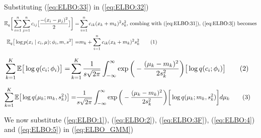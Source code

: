 \documentclass[]{article}
\newcommand{\Expectation} {\mathbb{E}}
\newcommand\numberthis    {\addtocounter{equation}{1}\tag{\theequation}}
\begin{document}
Substituting (\ref{eq:ELBO:33}) in (\ref{eq:ELBO:32})
\begin{align*}
	\Expectation_q\bigg[\sum_{i=1}^{n}\sum_{j=1}^{n} c_{ij}\big[\frac{-(x_i-\mu_j)^2}{2}\big]\bigg]=& \sum_{i=1}^{n} c_{ik} (x_k+m_k)^2 s_k^2 \text{, combing with (\ref{eq:ELBO:31}), (\ref{eq:ELBO:3}) becomes}\\
	\Expectation_q\big[\log{p(x_i\mid c_i,\mu);\phi_i,m,s^2}\big] =& m_k + \sum_{i=1}^{n} c_{ik} (x_k+m_k)^2 s_k^2 \numberthis \label{eq:ELBO:3F}	
\end{align*}


\begin{align*}
	\sum_{k=1}^K\Expectation\big[\log{q(c_i;\phi_i)}\big] =& \sum_{k=1}^K\frac{1}{s\sqrt{2\pi}} \int_{-\infty}^{\infty} \exp{\bigg(- \frac{(\mu_k-m_k)^2}{2 s_k^2}\bigg)}\big[\log{q(c_i;\phi_i)}\big] \numberthis \label{eq:ELBO:4}
\end{align*}

\begin{align*}
 	\sum_{k=1}^K\Expectation \big[\log{q(\mu_k;m_k,s^2_k)}\big] =& \frac{1}{s\sqrt{2\pi}} \int_{-\infty}^{\infty} \exp{\bigg(- \frac{(\mu_k-m_k)^2}{2 s_k^2}\bigg)} \bigg[\log{q(\mu_k;m_k,s^2_k)} \bigg] d\mu_k \numberthis \label{eq:ELBO:5}
\end{align*}

We now substitute (\ref{eq:ELBO:1}), (\ref{eq:ELBO:2}), (\ref{eq:ELBO:3F}), (\ref{eq:ELBO:4}) and (\ref{eq:ELBO:5}) in (\ref{eq:ELBO_GMM}) 
\printglossaries




\end{document}
